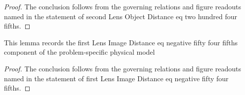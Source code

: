 \begin{proof}
  The conclusion follows from the governing relations and figure readouts named in the statement of second Lens Object Distance eq two hundred four fifths.
\end{proof}
\begin{lemma}
  \label{lem:physics:phyx-mini-0148:phyxminiproblems-problemphyxmini0148-firstlensimagedistance-eq-negative-fifty-four-fifths}
  This lemma records the first Lens Image Distance eq negative fifty four fifths component of the problem-specific physical model
\end{lemma}
\begin{proof}
  The conclusion follows from the governing relations and figure readouts named in the statement of first Lens Image Distance eq negative fifty four fifths.
\end{proof}
